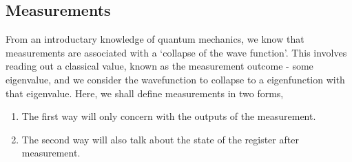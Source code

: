 \subsection{Measurements}
From an introductary knowledge of quantum mechanics, we know that measurements are associated with a `collapse of the wave function'. This involves reading out a classical value, known as the measurement outcome - some eigenvalue, and we consider the wavefunction to collapse to a eigenfunction with that eigenvalue. Here, we shall define measurements in two forms,
\begin{enumerate}
    \item The first way will only concern with the outputs of the measurement.
    \item The second way will also talk about the state of the register after measurement.
\end{enumerate}
